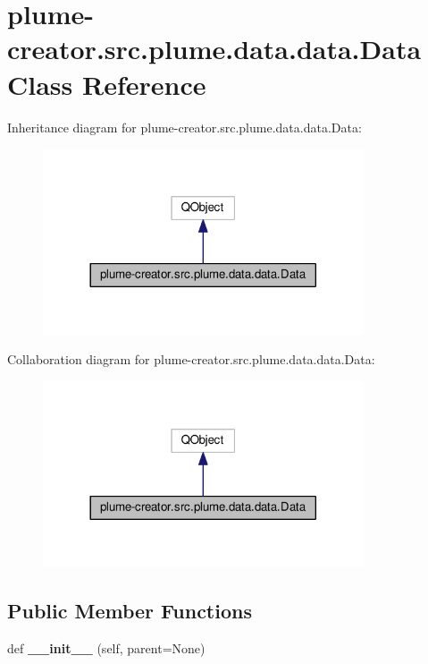 \hypertarget{classplume-creator_1_1src_1_1plume_1_1data_1_1data_1_1_data}{}\section{plume-\/creator.src.\+plume.\+data.\+data.\+Data Class Reference}
\label{classplume-creator_1_1src_1_1plume_1_1data_1_1data_1_1_data}


Inheritance diagram for plume-\/creator.src.\+plume.\+data.\+data.\+Data\+:\nopagebreak
\begin{figure}[H]
\begin{center}
\leavevmode
\includegraphics[width=269pt]{classplume-creator_1_1src_1_1plume_1_1data_1_1data_1_1_data__inherit__graph}
\end{center}
\end{figure}


Collaboration diagram for plume-\/creator.src.\+plume.\+data.\+data.\+Data\+:\nopagebreak
\begin{figure}[H]
\begin{center}
\leavevmode
\includegraphics[width=269pt]{classplume-creator_1_1src_1_1plume_1_1data_1_1data_1_1_data__coll__graph}
\end{center}
\end{figure}
\subsection*{Public Member Functions}
\begin{DoxyCompactItemize}
\item 
def {\bfseries \+\_\+\+\_\+init\+\_\+\+\_\+} (self, parent=None)\hypertarget{classplume-creator_1_1src_1_1plume_1_1data_1_1data_1_1_data_ad363c214cac8ee474d6364fc05170a35}{}\label{classplume-creator_1_1src_1_1plume_1_1data_1_1data_1_1_data_ad363c214cac8ee474d6364fc05170a35}

\end{DoxyCompactItemize}
